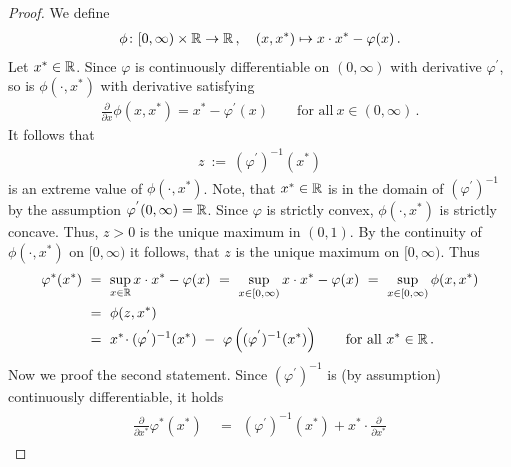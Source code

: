 \begin{proof}
We define
\begin{gather*}
 \phi
 \colon
 [0,\infty)
 \times
 \mathbb{R}
 \to
 \mathbb{R}
 \,,
 \quad
 (x,x^*)
 \mapsto
 x\cdot x^*
 -
 \varphi(x)
 \,.
\end{gather*}
Let $x^*\in\mathbb{R}$.
Since
      $\varphi$ is continuously differentiable on $(0,\infty)$ with derivative $\varphi^{'}$,
      so is $\phi(\cdot,x^*)$ with derivative
      satisfying 
      \begin{gather*}
        \frac{\partial}{\partial x}
        \phi(x,x^*)
        =
        x^*
        -
        \varphi^{'}(x)
        \qquad
        \text{for all}\ 
        x\in(0,\infty)
        \,.
      \end{gather*}
  It follows that 
  \begin{gather*}
    z
    \ 
    :=
    \ 
      (
    \varphi^{'}
    )^{-1}
    (x^*)
  \end{gather*}
  is an extreme value of $\phi(\cdot,x^*)$.
  Note, that $x^*\in\mathbb{R}$ is in the domain of 
  $
      (
    \varphi^{'}
    )^{-1}
  $
  by the assumption $\varphi^{'}(0,\infty)=\mathbb{R}$.
  Since $\varphi$ is strictly convex, $\phi(\cdot,x^*)$ is strictly concave. 
  Thus,
  $z>0$ is the unique maximum in $(0,1)$.
  By the continuity of $\phi(\cdot,x^*)$ on $[0,\infty)$ it follows, that $z$ is the unique maximum on $[0,\infty)$.
  Thus
  \begin{align*}
    \varphi^*(x^*)
    &
    \ 
    =
    \ 
    \sup_{x\in\R}
    x\cdot x^* - \varphi(x)
    \ 
    =
    \ 
    \sup_{x\in [0,\infty)}
    x\cdot x^* - \varphi(x)
    \ 
    =
    \ 
    \sup_{x\in [0,\infty)}
    \phi(x,x^*)
    \\
    &
    \ 
    =
    \ 
    \phi(z,x^*)
    \\
    &
    \ 
    =
    \ 
    x^*
    \!
    \cdot
    (
    \varphi^{'}
    )^{-1}
    (x^*)
    \ 
    -
    \ 
    \varphi
    \left( 
      (
    \varphi^{'}
    )^{-1}
    (x^*)
    \right)
    \qquad 
    \text{for all}\ 
    x^*\in\R
    \,.
  \end{align*}
  Now we proof the second statement.
  Since
  $
      (
    \varphi^{'}
    )^{-1}
  $
  is (by assumption) continuously differentiable, it holds
  \begin{align}
    \label{0098}
    \begin{split}
    \frac{\partial}{\partial x^*}
     \varphi^*(x^*)
    &
    \ 
    =
    \ 
    \ 
    (
    \varphi^{'}
    )^{-1}
    (x^*)
    +
    x^*
    \!
    \cdot
    \frac{\partial}{\partial x^*}

\end{split}
\end{align}
\end{proof}
